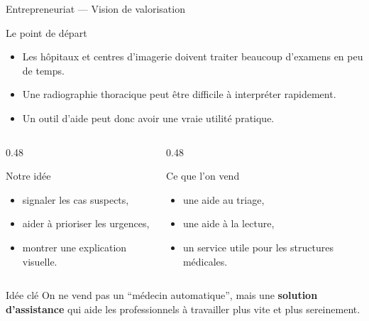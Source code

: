 \begin{frame}[t]{Entrepreneuriat --- Vision de valorisation}
\scriptsize
\begin{block}{Le point de départ}
\begin{itemize}
\setlength{\itemsep}{0.22em}
\item Les hôpitaux et centres d'imagerie doivent traiter beaucoup d'examens en peu de temps.
\item Une radiographie thoracique peut être difficile à interpréter rapidement.
\item Un outil d'aide peut donc avoir une vraie utilité pratique.
\end{itemize}
\end{block}

\begin{columns}[T,onlytextwidth]
\begin{column}{0.48\textwidth}
\begin{block}{Notre idée}
\begin{itemize}
\setlength{\itemsep}{0.18em}
\item signaler les cas suspects,
\item aider à prioriser les urgences,
\item montrer une explication visuelle.
\end{itemize}
\end{block}
\end{column}
\begin{column}{0.48\textwidth}
\begin{block}{Ce que l'on vend}
\begin{itemize}
\setlength{\itemsep}{0.18em}
\item une aide au triage,
\item une aide à la lecture,
\item un service utile pour les structures médicales.
\end{itemize}
\end{block}
\end{column}
\end{columns}

\begin{alertblock}{Idée clé}
On ne vend pas un ``médecin automatique'', mais une \textbf{solution d'assistance} qui aide les professionnels à travailler plus vite et plus sereinement.
\end{alertblock}
\end{frame}

